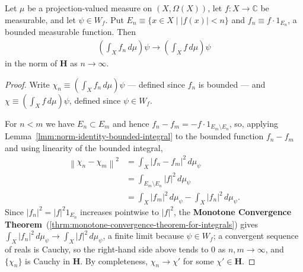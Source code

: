 \begin{lemma}
    \label{lmm:truncations-converge}
    \leanok
    Let $\mu$ be a projection-valued measure on $(X,\Omega(X))$, let $f : X \to \mathbb{C}$ be measurable, and let $\psi \in W_f$. Put $E_n \equiv \{ x \in X \mid \lvert f(x) \rvert < n \}$ and $f_n \equiv f\cdot 1_{E_n}$, a bounded measurable function. Then
    \begin{align}
        \left( \int_X f_n \, d\mu \right)\psi \longrightarrow \left( \int_X f \, d\mu \right)\psi
    \end{align}
    in the norm of $\mathbf{H}$ as $n \to \infty$.
\end{lemma}
\begin{proof}
    \leanok
Write $\chi_n \equiv \left( \int_X f_n \, d\mu \right)\psi$ — defined since $f_n$ is bounded — and $\chi \equiv \left( \int_X f \, d\mu \right)\psi$, defined since $\psi \in W_f$.

For $n < m$ we have $E_n \subset E_m$ and hence $f_n - f_m = -f\cdot 1_{E_m \setminus E_n}$, so, applying Lemma~\ref{lmm:norm-identity-bounded-integral} to the bounded function $f_n - f_m$ and using linearity of the bounded integral,
\begin{align}
    \left\| \chi_n - \chi_m \right\|^2 &= \int_X \lvert f_n - f_m \rvert^2 \, d\mu_\psi \\
                &= \int_{E_m\setminus E_n} \lvert f \rvert^2 \, d\mu_\psi \\
                &= \int_X \lvert f_m \rvert^2 \, d\mu_\psi - \int_X \lvert f_n \rvert^2 \, d\mu_\psi.
\end{align}
Since $\lvert f_n \rvert^2 = \lvert f \rvert^2 1_{E_n}$ increases pointwise to $\lvert f \rvert^2$, the \textbf{Monotone Convergence Theorem}~(\ref{thrm:monotone-convergence-theorem-for-integrals}) gives $\int_X \lvert f_n \rvert^2 \, d\mu_\psi \to \int_X \lvert f \rvert^2\,d\mu_\psi$, a finite limit because $\psi \in W_f$; a convergent sequence of reals is Cauchy, so the right-hand side above tends to $0$ as $n,m\to\infty$, and $\{\chi_n\}$ is Cauchy in $\mathbf{H}$. By completeness, $\chi_n \to \chi'$ for some $\chi' \in \mathbf{H}$.


\end{proof}
